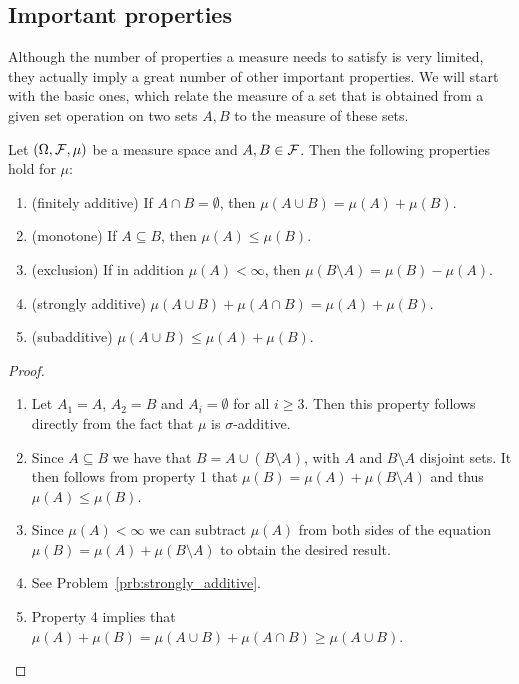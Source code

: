 \subsection{Important properties}

Although the number of properties a measure needs to satisfy is very limited, they actually imply a great number of other important properties. We will start with the basic ones, which relate the measure of a set that is obtained from a given set operation on two sets $A, B$ to the measure of these sets.

\begin{proposition}\label{prop:basic_properties_measures}
Let $(\Omega, \mathcal F, \mu)$ be a measure space and $A, B \in \mathcal F$. Then the following properties hold for $\mu$:
\begin{enumerate}
\item (finitely additive) If $A \cap B = \emptyset$, then $\mu(A \cup B) = \mu(A) + \mu(B)$.
\item (monotone) If $A \subseteq B$, then $\mu(A) \le \mu(B)$.
\item (exclusion) If in addition $\mu(A) < \infty$, then $\mu(B \setminus A) = \mu(B) - \mu(A)$.
\item (strongly additive) $\mu(A \cup B) + \mu(A \cap B) = \mu(A) + \mu(B)$.
\item (subadditive) $\mu(A \cup B) \le \mu(A) + \mu(B)$.
\end{enumerate}
\end{proposition}

\begin{proof}
\hfil
\begin{enumerate}
\item Let $A_1 = A$, $A_2 = B$ and $A_i = \emptyset$ for all $i \ge 3$. Then this property follows directly from the fact that $\mu$ is $\sigma$-additive.
\item Since $A \subseteq B$ we have that $B = A \cup (B \setminus A)$, with $A$ and $B \setminus A$ disjoint sets. It then follows from property 1 that $\mu(B) = \mu(A) + \mu(B \setminus A)$ and thus $\mu(A) \le \mu(B)$.
\item Since $\mu(A) < \infty$ we can subtract $\mu(A)$ from both sides of the equation $\mu(B) = \mu(A) + \mu(B \setminus A)$ to obtain the desired result.
\item See Problem~\ref{prb:strongly_additive}. 
\item Property 4 implies that $\mu(A) + \mu(B) = \mu(A \cup B) + \mu(A \cap B) \ge \mu(A \cup B)$.\qedhere
\end{enumerate}
\end{proof}

